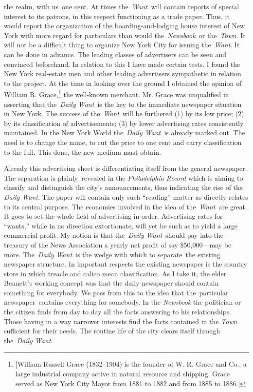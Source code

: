 \documentclass[openany,nobib]{tufte-book}
\begin{document}
the realm, with us~one cent. At times the~\emph{Want~}will contain
reports of special interest to its patrons, in this respect functioning
as a trade paper. Thus, it would report the organization of the
boarding-and-lodging house interest of New York with more regard for
particulars than would the~\emph{Newsbook~}or the~\emph{Town}. It will
not be a difficult thing to organize New York City for issuing
the~\emph{Want}. It can be done in advance. The leading classes of
advertisers can be seen and convinced beforehand. In relation to this I
have made certain tests. I found the New York real-estate men and other
leading advertisers sympathetic in relation to the project. At the time
in looking over the ground I obtained the opinion of William R.
Grace,\footnote{{[}William Russell Grace (1832--1904) is the founder of
  W. R. Grace and Co., a large industrial company active in natural
  resource and shipping. Grace served as New York City Mayor from 1881
  to 1882 and from 1885 to 1886.{]}} the well-known merchant. Mr. Grace
was unqualified in asserting that the~\emph{Daily Want~}is the key to
the immediate newspaper situation in New York. The success of
the~\emph{Want}~will be furthered (1) by its low price; (2) by its
classification of advertisements; (3) by lower advertising rates
consistently maintained. In the New York World the\emph{~Daily Want~}is
already marked out. The need is to change the name, to cut the price to
one cent and carry classification to the full. This done, the new medium
must obtain.~

Already this advertising sheet is differentiating itself from the
general newspaper. The separation is plainly~revealed in the
\emph{Philadelphia Record} which is aiming to classify and distinguish
the city's announcements, thus indicating the rise of the \emph{Daily
Want}. The paper will contain only such ``reading'' matter as directly
relates to its central purpose. The economies involved in the idea of
the\emph{~Want~}are great. It goes to set the whole field of advertising
in order. Advertising rates for ``wants,'' while in no direction
extortionate, will yet be such as to yield a large commercial profit. My
notion is that the~\emph{Daily Want}~should pay into the treasury of the
News Association a yearly net profit of say \$50,000---may be more.
The~\emph{Daily Want}~is the wedge with which to separate~the existing
newspaper structure. In important respects the existing newspaper is the
country store in which treacle and calico mean classification. As I take
it, the elder Bennett's working concept was that the daily newspaper
should contain something for everybody. We pass from this to the idea
that the~particular newspaper~contains everything for somebody. In the
\emph{Newsbook} the politician or the citizen finds from day to day all
the facts answering to his relationships. Those having in a way narrower
interests find the facts contained in the \emph{Town} sufficient for
their needs. The routine life of the city clears itself through
the~\emph{Daily Want}.~
\end{document}
